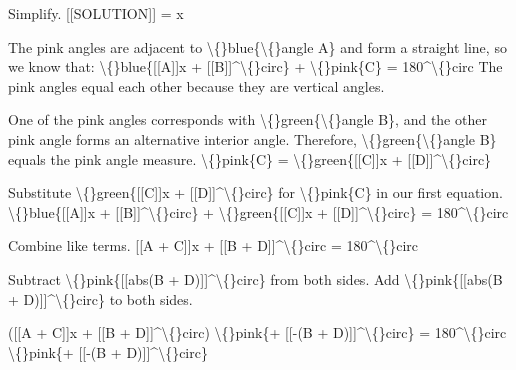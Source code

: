 \documentclass{article}
\begin{document}
\begin{itemize}
{{{{{{{{                    
                        Simplify.
                        [[SOLUTION]] = x
  \item The pink angles are adjacent to \textbackslash\{\}blue\{\textbackslash\{\}angle A\} and form a straight line, so we know that:
                    \textbackslash\{\}blue\{[[A]]x + [[B]]\textasciicircum{}\textbackslash\{\}circ\} + \textbackslash\{\}pink\{C\} = 180\textasciicircum{}\textbackslash\{\}circ
                    The pink angles equal each other because they are vertical angles.
  \item One of the pink angles corresponds with \textbackslash\{\}green\{\textbackslash\{\}angle B\},
                        and the other pink angle forms an alternative interior angle.
                        Therefore, \textbackslash\{\}green\{\textbackslash\{\}angle B\} equals the pink angle measure.
                    \textbackslash\{\}pink\{C\} = \textbackslash\{\}green\{[[C]]x + [[D]]\textasciicircum{}\textbackslash\{\}circ\}
  \item Substitute \textbackslash\{\}green\{[[C]]x + [[D]]\textasciicircum{}\textbackslash\{\}circ\} for \textbackslash\{\}pink\{C\} in our first equation.
                    \textbackslash\{\}blue\{[[A]]x + [[B]]\textasciicircum{}\textbackslash\{\}circ\} + \textbackslash\{\}green\{[[C]]x + [[D]]\textasciicircum{}\textbackslash\{\}circ\} = 180\textasciicircum{}\textbackslash\{\}circ
  \item Combine like terms.
                    [[A + C]]x + [[B + D]]\textasciicircum{}\textbackslash\{\}circ = 180\textasciicircum{}\textbackslash\{\}circ
  \item Subtract \textbackslash\{\}pink\{[[abs(B + D)]]\textasciicircum{}\textbackslash\{\}circ\} from both sides.
                    Add \textbackslash\{\}pink\{[[abs(B + D)]]\textasciicircum{}\textbackslash\{\}circ\} to both sides.
                    
                        ([[A + C]]x + [[B + D]]\textasciicircum{}\textbackslash\{\}circ) \textbackslash\{\}pink\{+ [[-(B + D)]]\textasciicircum{}\textbackslash\{\}circ\} =
                        180\textasciicircum{}\textbackslash\{\}circ \textbackslash\{\}pink\{+ [[-(B + D)]]\textasciicircum{}\textbackslash\{\}circ\}
                    
}}}}}}}}
\end{itemize}
\end{document}
